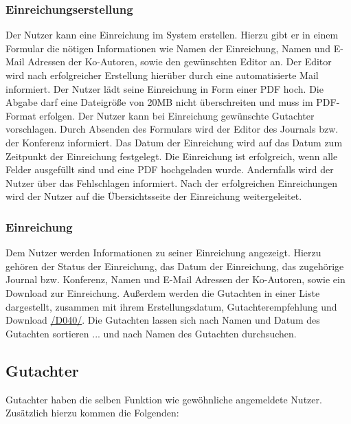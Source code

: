\subsubsection{Einreichungserstellung}
\begin{description}
     Der Nutzer kann eine Einreichung im System erstellen. Hierzu gibt er in einem
    Formular die nötigen Informationen wie Namen der Einreichung, Namen und E-Mail Adressen der Ko-Autoren,
    sowie den gewünschten Editor an. Der Editor wird nach erfolgreicher Erstellung hierüber durch eine
    automatisierte Mail informiert.
     Der Nutzer lädt seine Einreichung in Form einer PDF hoch. Die Abgabe darf eine Dateigröße
    von 20MB nicht überschreiten und muss im PDF-Format erfolgen.
     Der Nutzer kann bei Einreichung gewünschte Gutachter vorschlagen.
     Durch Absenden des Formulars wird der Editor des Journals bzw. der Konferenz
    informiert. Das Datum der Einreichung wird auf das Datum zum Zeitpunkt der Einreichung festgelegt.
     Die Einreichung ist erfolgreich, wenn alle Felder ausgefüllt sind und eine PDF
    hochgeladen wurde. Andernfalls wird der Nutzer über das Fehlschlagen informiert.
     Nach der erfolgreichen Einreichungen wird der Nutzer auf die Übersichtsseite der
    Einreichung weitergeleitet.
\end{description}

\subsubsection{Einreichung}
\begin{description}
     Dem Nutzer werden Informationen zu seiner Einreichung angezeigt.
    Hierzu gehören der Status der Einreichung, das Datum der Einreichung, das zugehörige
    Journal bzw. Konferenz, Namen und E-Mail Adressen der Ko-Autoren, sowie ein Download zur Einreichung.
     Außerdem werden die Gutachten in einer
    Liste dargestellt, zusammen mit ihrem Erstellungsdatum, Gutachterempfehlung und Download \hyperref[d040]{/D040/}.
     Die Gutachten lassen sich nach Namen und Datum
    des Gutachten sortieren
    ... und nach Namen des Gutachten durchsuchen.
\end{description}

\subsection{Gutachter}\label{funkt:Gutachter}
Gutachter haben die selben Funktion wie gewöhnliche angemeldete Nutzer. Zusätzlich hierzu kommen die Folgenden:

